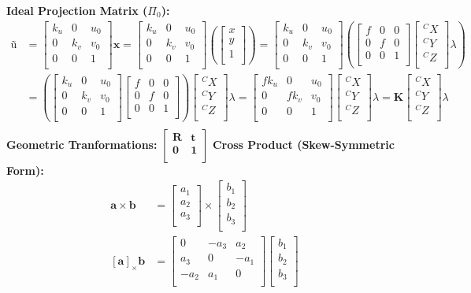 \documentclass[a4paper,10pt]{article}
\newcommand{\sHu}{\ensuremath{\textbf{\~{u}}}}
\newcommand{\sHx}{\ensuremath{\textbf{\~{x}}}}
\newcommand{\sNHK}{\ensuremath{\textbf{K}}}
\newcommand{\vHxy}{\ensuremath{\left[\begin{array}{c}x\\y\\1\\\end{array}\right]}}
\newcommand{\mHkuv}{\ensuremath{\left[\begin{array}{ccc}k_u & 0 & u_0\\0 & k_v & v_0\\ 0 & 0 & 1\\\end{array}\right]}}
\newcommand{\mNHf}{\ensuremath{\left[\begin{array}{ccc}f & 0 & 0\\0 & f & 0\\0 & 0 & 1\\\end{array}\right]}}
\newcommand{\vNHcx}{\ensuremath{\left[\begin{array}{c}^CX\\^CY\\^CZ\\\end{array}\right]}}
\newcommand{\mHfkuv}{\ensuremath{\left[\begin{array}{ccc}fk_u & 0 & u_0\\0 & fk_v & v_0\\ 0 & 0 & 1\\\end{array}\right]}}
\newcommand{\mRTzeroone}{\ensuremath{\left[\begin{array}{c|c}\mathbf{R}&\mathbf{t}\\\hline\mathbf{0}&\mathbf{1}\\\end{array}\right]}}
\begin{document}
\textbf{Ideal Projection Matrix ($\Pi_0$):}
\newline\noindent\newline\noindent
\begin{equation}
\begin{split}
\sHu &= \mHkuv\sHx = \mHkuv\left(\vHxy\right)=\mHkuv\left(\mNHf\vNHcx\lambda\right)\\
&=\left(\mHkuv\mNHf\right)\vNHcx\lambda=\mHfkuv\vNHcx\lambda=\sNHK\vNHcx\lambda\\\
\end{split}
\end{equation}
\noindent\textbf{Geometric Tranformations:}
\newline\noindent\newline\noindent
\mRTzeroone
\newline\noindent\newline\noindent
\textbf{Cross Product (Skew-Symmetric Form):}
\newline\noindent\newline\noindent
\begin{equation*}
\begin{split}
\mathbf{a}\times\mathbf{b} &= 
\left[\begin{array}{c}a_{1}\\a_{2}\\a_{3}\\\end{array}\right]
\times
\left[\begin{array}{c}b_{1}\\b_{2}\\b_{3}\\\end{array}\right]
\\       
{[\mathbf{a}]}_{\times}{\mathbf{b}}
&=
\left[\begin{array}{rrr}
0 & -a_{3} & a_{2}\\
a_{3} & 0 & -a_{1}\\
-a_{2} & a_{1} & 0\\
      \end{array}\right]
\left[\begin{array}{c}b_{1}\\b_{2}\\b_{3}\\\end{array}\right]      
\end{split}
\end{equation*}
\end{document}
